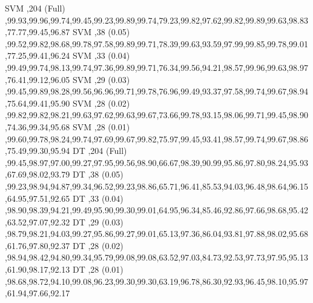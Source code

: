 \documentclass[journal]{IEEEtran}
\begin{document}
\begin{table*}[ht!]
{%
SVM	,204 (Full)	,99.93,99.96,99.74,99.45,99.23,99.89,99.74,79.23,99.82,97.62,99.82,99.89,99.63,98.83,77.77,99.45,96.87
SVM	,38 (0.05)	,99.52,99.82,98.68,99.78,97.58,99.89,99.71,78.39,99.63,93.59,97.99,99.85,99.78,99.01,77.25,99.41,96.24
SVM	,33 (0.04)	,99.49,99.74,98.13,99.74,97.36,99.89,99.71,76.34,99.56,94.21,98.57,99.96,99.63,98.97,76.41,99.12,96.05
SVM	,29 (0.03)	,99.45,99.89,98.28,99.56,96.96,99.71,99.78,76.96,99.49,93.37,97.58,99.74,99.67,98.94,75.64,99.41,95.90
SVM	,28 (0.02)	,99.82,99.82,98.21,99.63,97.62,99.63,99.67,73.66,99.78,93.15,98.06,99.71,99.45,98.90,74.36,99.34,95.68
SVM	,28 (0.01)	,99.60,99.78,98.24,99.74,97.69,99.67,99.82,75.97,99.45,93.41,98.57,99.74,99.67,98.86,75.49,99.30,95.94
DT	,204 (Full)	,99.45,98.97,97.00,99.27,97.95,99.56,98.90,66.67,98.39,90.99,95.86,97.80,98.24,95.93,67.69,98.02,93.79
DT	,38 (0.05)	,99.23,98.94,94.87,99.34,96.52,99.23,98.86,65.71,96.41,85.53,94.03,96.48,98.64,96.15,64.95,97.51,92.65
DT	,33 (0.04)	,98.90,98.39,94.21,99.49,95.90,99.30,99.01,64.95,96.34,85.46,92.86,97.66,98.68,95.42,63.52,97.07,92.32
DT	,29 (0.03)	,98.79,98.21,94.03,99.27,95.86,99.27,99.01,65.13,97.36,86.04,93.81,97.88,98.02,95.68,61.76,97.80,92.37
DT	,28 (0.02)	,98.94,98.42,94.80,99.34,95.79,99.08,99.08,63.52,97.03,84.73,92.53,97.73,97.95,95.13,61.90,98.17,92.13
DT	,28 (0.01)	,98.68,98.72,94.10,99.08,96.23,99.30,99.30,63.19,96.78,86.30,92.93,96.45,98.10,95.97,61.94,97.66,92.17
}
\end{table*}
\end{document}
